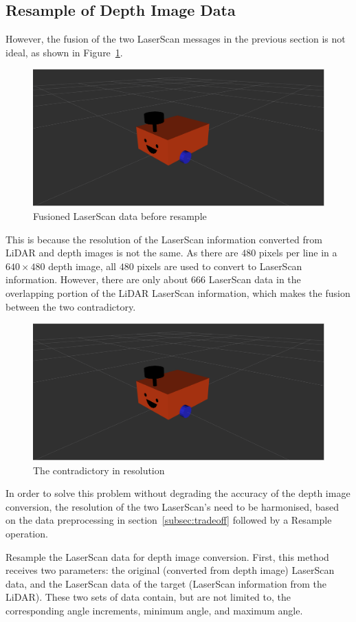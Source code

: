 \subsection{Resample of Depth Image Data}
However, the fusion of the two LaserScan messages in the previous section is not ideal, as shown in Figure~\ref{fig:fusioned}.
\begin{figure}[H]
    \centering
    \includegraphics[width=0.8\linewidth]{figs/robot.png}
    \caption{Fusioned LaserScan data before resample}
    \label{fig:fusioned}
\end{figure}
This is because the resolution of the LaserScan information converted from LiDAR and depth images is not the same. 
As there are $480$ pixels per line in a $640\times480$ depth image, 
all $480$ pixels are used to convert to LaserScan information. 
However, there are only about 666 LaserScan data in the overlapping portion of the LiDAR LaserScan information, 
which makes the fusion between the two contradictory.
\begin{figure}[H]
    \centering
    \includegraphics[width=0.8\linewidth]{figs/robot.png}
    \caption{The contradictory in resolution}
\end{figure}
In order to solve this problem without degrading the accuracy of the depth image conversion, 
the resolution of the two LaserScan's need to be harmonised,
based on the data preprocessing in section~\ref{subsec:tradeoff} followed by a Resample operation.

Resample the LaserScan data for depth image conversion. 
First, this method receives two parameters: the original (converted from depth image) LaserScan data, 
and the LaserScan data of the target (LaserScan information from the LiDAR). 
These two sets of data contain, but are not limited to, 
the corresponding angle increments, minimum angle, and maximum angle.


